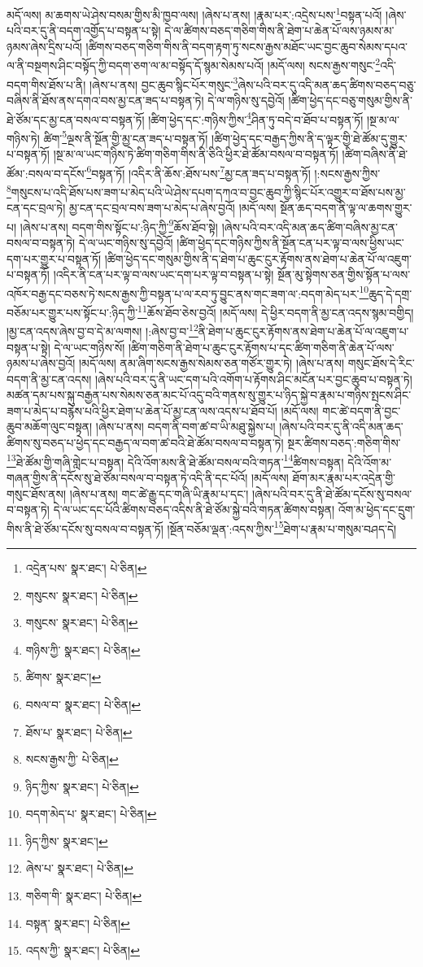 མདོ་ལས། མ་ཆགས་ཡེ་ཤེས་བསམ་གྱིས་མི་ཁྱབ་ལས། །ཞེས་པ་ནས། །རྣམ་པར་:འདྲེས་པས་\footnote{འདྲེན་པས་  སྣར་ཐང་།  པེ་ཅིན། }བསྟན་པའོ། །ཞེས་པའི་བར་དུ་ནི་བདག་འགྱོད་པ་བསྟན་པ་སྟེ། དེ་ལ་ཚིགས་བཅད་གཅིག་གིས་ནི་ཐེག་པ་ཆེན་པོ་ལས་ཉམས་མ་ཉམས་ཞེས་དྲིས་པའོ། །ཚིགས་བཅད་གཅིག་གིས་ནི་བདག་རྟག་ཏུ་སངས་རྒྱས་མཐོང་ཡང་བྱང་ཆུབ་སེམས་དཔའ་ལ་ནི་བསྔགས་ཤིང་བསྟོད་ཀྱི་བདག་ཅག་ལ་མ་བསྟོད་དོ་སྙམ་སེམས་པའོ། །མདོ་ལས། སངས་རྒྱས་གསུང་\footnote{གསུངས་  སྣར་ཐང་།  པེ་ཅིན། }འདི་བདག་གིས་ཐོས་པ་ནི། །ཞེས་པ་ནས། བྱང་ཆུབ་སྙིང་པོར་གསུང་\footnote{གསུངས་  སྣར་ཐང་།  པེ་ཅིན། }ཞེས་པའི་བར་དུ་འདི་མན་ཆད་ཚིགས་བཅད་བཅུ་བཞིས་ནི་ཐོས་ནས་དགའ་བས་མྱ་ངན་ཟད་པ་བསྟན་ཏེ། དེ་ལ་གཉིས་སུ་དབྱེའོ། །ཚིག་ཕྱེད་དང་བཅུ་གསུམ་གྱིས་ནི་ཐེ་ཙོམ་དང་མྱ་ངན་བསལ་བ་བསྟན་ཏོ། །ཚིག་ཕྱེད་དང་:གཉིས་ཀྱིས་\footnote{གཉིས་ཀྱི་  སྣར་ཐང་།  པེ་ཅིན། }ཤིན་ཏུ་བདེ་བ་ཐོབ་པ་བསྟན་ཏོ། །སྔ་མ་ལ་གཉིས་ཏེ། ཚིག་\footnote{ཚིགས་  སྣར་ཐང་། }ལྔས་ནི་སྔོན་གྱི་མྱ་ངན་ཟད་པ་བསྟན་ཏོ། །ཚིག་ཕྱེད་དང་བརྒྱད་ཀྱིས་ནི་ད་ལྟར་གྱི་ཐེ་ཚོམ་དུ་གྱུར་པ་བསྟན་ཏོ། །སྔ་མ་ལ་ཡང་གཉིས་ཏེ་ཚིག་གཅིག་གིས་ནི་ཅིའི་ཕྱིར་ཐེ་ཚོམ་བསལ་བ་བསྟན་ཏོ། །ཚིག་བཞིས་ནི་ཐེ་ཚོམ་:བསལ་བ་དངོས་\footnote{བསལ་བ་  སྣར་ཐང་།  པེ་ཅིན། }བསྟན་ཏོ། །འདིར་ནི་ཆོས་:ཐོས་པས་\footnote{ཐོས་པ་  སྣར་ཐང་།  པེ་ཅིན། }མྱ་ངན་ཟད་པ་བསྟན་ཏོ། །:སངས་རྒྱས་ཀྱིས་\footnote{སངས་རྒྱས་ཀྱི་  པེ་ཅིན། }གསུངས་པ་འདི་ཐོས་པས་ཟག་པ་མེད་པའི་ཡེ་ཤེས་དཔག་དཀའ་བ་བྱང་ཆུབ་ཀྱི་སྙིང་པོར་འགྱུར་བ་ཐོས་པས་མྱ་ངན་དང་བྲལ་ཏེ། མྱ་ངན་དང་བྲལ་བས་ཟག་པ་མེད་པ་ཞེས་བྱའོ། །མདོ་ལས། སྔོན་ཆད་བདག་ནི་ལྟ་ལ་ཆགས་གྱུར་པ། །ཞེས་པ་ནས། བདག་གིས་སྟོང་པ་:ཉིད་ཀྱི་\footnote{ཉིད་ཀྱིས་  སྣར་ཐང་།  པེ་ཅིན། }ཆོས་ཐོབ་སྟེ། །ཞེས་པའི་བར་འདི་མན་ཆད་ཚིག་བཞིས་མྱ་ངན་བསལ་བ་བསྟན་ཏེ། དེ་ལ་ཡང་གཉིས་སུ་དབྱེའོ། །ཚིག་ཕྱེད་དང་གཉིས་ཀྱིས་ནི་སྔོན་ངན་པར་ལྟ་བ་ལས་ཕྱིས་ཡང་དག་པར་གྱུར་པ་བསྟན་ཏོ། །ཚིག་ཕྱེད་དང་གསུམ་གྱིས་ནི་ད་ཐེག་པ་ཆུང་ངུར་རྟོགས་ནས་ཐེག་པ་ཆེན་པོ་ལ་འཇུག་པ་བསྟན་ཏོ། །འདིར་ནི་ངན་པར་ལྟ་བ་ལས་ཡང་དག་པར་ལྟ་བ་བསྟན་པ་སྟེ། སྔོན་མུ་སྟེགས་ཅན་གྱིས་སྟོན་པ་ལས་འཁོར་བརྒྱ་དང་བཅས་ཏེ་སངས་རྒྱས་ཀྱི་བསྟན་པ་ལ་རབ་ཏུ་བྱུང་ནས་གང་ཟག་ལ་:བདག་མེད་པར་\footnote{བདག་མེད་པ་  སྣར་ཐང་།  པེ་ཅིན། }ཆུད་དེ་དགྲ་བཅོམ་པར་གྱུར་པས་སྟོང་པ་:ཉིད་ཀྱི་\footnote{ཉིད་ཀྱིས་  སྣར་ཐང་། }ཆོས་ཐོབ་ཅེས་བྱའོ། །མདོ་ལས། དེ་ཕྱིར་བདག་ནི་མྱ་ངན་འདས་སྙམ་བགྱིད། །མྱ་ངན་འདས་ཞེས་བྱ་བ་དེ་མ་ལགས། །:ཞེས་བྱ་བ་\footnote{ཞེས་པ་  སྣར་ཐང་།  པེ་ཅིན། }ནི་ཐེག་པ་ཆུང་ངུར་རྟོགས་ནས་ཐེག་པ་ཆེན་པོ་ལ་འཇུག་པ་བསྟན་པ་སྟེ། དེ་ལ་ཡང་གཉིས་སོ། །ཚིག་གཅིག་ནི་ཐེག་པ་ཆུང་ངུར་རྟོགས་པ་དང་ཚིག་གཅིག་ནི་ཆེན་པོ་ལས་ཉམས་པ་ཞེས་བྱའོ། །མདོ་ལས། ནམ་ཞིག་སངས་རྒྱས་སེམས་ཅན་གཙོར་གྱུར་ཏེ། །ཞེས་པ་ནས། གསུང་ཐོས་དེ་རིང་བདག་ནི་མྱ་ངན་འདས། །ཞེས་པའི་བར་དུ་ནི་ཡང་དག་པའི་འགོག་པ་རྟོགས་ཤིང་མངོན་པར་བྱང་ཆུབ་པ་བསྟན་ཏེ། མཚན་དམ་པས་སྐུ་བརྒྱན་པས་སེམས་ཅན་མང་པོ་འདུ་བའི་གནས་སུ་གྱུར་པ་ཉིད་སྐྱེ་བ་རྣམ་པ་གཉིས་སྤངས་ཤིང་ཟག་པ་མེད་པ་བརྙེས་པའི་ཕྱིར་ཐེག་པ་ཆེན་པོ་མྱ་ངན་ལས་འདས་པ་ཐོབ་པོ། །མདོ་ལས། གང་ཚེ་བདག་ནི་བྱང་ཆུབ་མཆོག་ལུང་བསྟན། །ཞེས་པ་ནས། བདག་ནི་བག་ཚ་བ་ཡི་མཐུ་སྐྱེས་པ། །ཞེས་པའི་བར་དུ་ནི་འདི་མན་ཆད་ཚིགས་སུ་བཅད་པ་ཕྱེད་དང་བརྒྱད་ལ་བག་ཚ་བའི་ཐེ་ཚོམ་བསལ་བ་བསྟན་ཏེ། སྔར་ཚིགས་བཅད་:གཅིག་གིས་\footnote{གཅིག་གི་  སྣར་ཐང་།  པེ་ཅིན། }ཐེ་ཚོམ་གྱི་གཞི་གླེང་པ་བསྟན། དེའི་འོག་མས་ནི་ཐེ་ཚོམ་བསལ་བའི་གཏན་\footnote{བསྟན་  སྣར་ཐང་།  པེ་ཅིན། }ཚིགས་བསྟན། དེའི་འོག་མ་གཞན་གྱིས་ནི་དངོས་སུ་ཐེ་ཙོམ་བསལ་བ་བསྟན་ཏེ་འདི་ནི་དང་པོའོ། །མདོ་ལས། ཐོག་མར་རྣམ་པར་འདྲེན་གྱི་གསུང་ཐོས་ནས། །ཞེས་པ་ནས། གང་ཚེ་རྒྱུ་དང་གཞི་ཡི་རྣམ་པ་དང་། །ཞེས་པའི་བར་དུ་ནི་ཐེ་ཚོམ་དངོས་སུ་བསལ་བ་བསྟན་ཏེ། དེ་ལ་ཡང་དང་པོའི་ཚིགས་བཅད་འདིས་ནི་ཐེ་ཙོམ་སྐྱེ་བའི་གཏན་ཚིགས་བསྟན། འོག་མ་ཕྱེད་དང་དྲུག་གིས་ནི་ཐེ་ཙོམ་དངོས་སུ་བསལ་བ་བསྟན་ཏོ། །སྔོན་བཅོམ་ལྡན་:འདས་ཀྱིས་\footnote{འདས་ཀྱི་  སྣར་ཐང་།  པེ་ཅིན། }ཐེག་པ་རྣམ་པ་གསུམ་བཤད་དེ། 